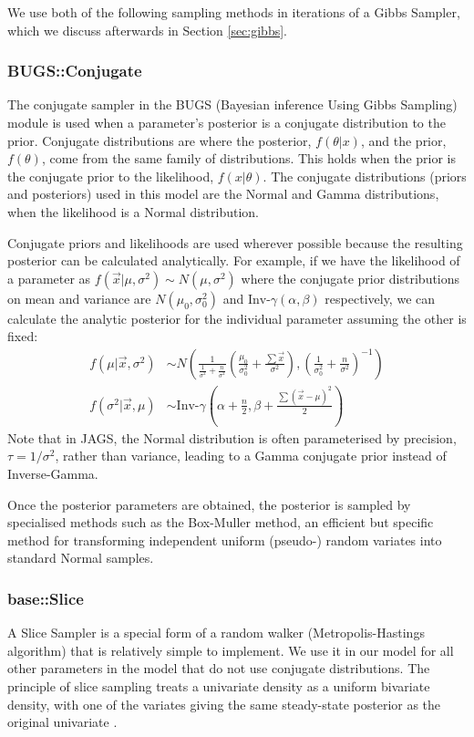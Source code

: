 \documentclass[a4paper, 12pt]{article}
\begin{document}
We use both of the following sampling methods in iterations of a Gibbs Sampler, which we discuss afterwards in Section \ref{sec:gibbs}.

\subsubsection{BUGS::Conjugate}
The conjugate sampler in the BUGS (Bayesian inference Using Gibbs Sampling) module is used when a parameter's posterior is a conjugate distribution to the prior. Conjugate distributions are where the posterior, $f(\theta|x)$, and the prior, $f(\theta)$, come from the same family of distributions. This holds when the prior is the conjugate prior to the likelihood, $f(x|\theta)$. The conjugate distributions (priors and posteriors) used in this model are the Normal and Gamma distributions, when the likelihood is a Normal distribution.

Conjugate priors and likelihoods are used wherever possible because the resulting posterior can be calculated analytically. For example, if we have the likelihood of a parameter as $f(\vec{x}|\mu,\sigma^2)\sim N(\mu,\sigma^2)$ where the conjugate prior distributions on mean and variance are $N(\mu_0,\sigma^2_0)$ and $\text{Inv-}\gamma(\alpha,\beta)$ respectively, we can calculate the analytic posterior for the individual parameter assuming the other is fixed:
\begin{align}
f(\mu|\vec{x},\sigma^2) &\sim N\left( \frac{1}{\frac{1}{\sigma^2} + \frac{n}{\sigma^2}} \left( \frac{\mu_0}{\sigma^2_0} + \frac{\sum\vec{x}}{\sigma^2} \right) , \left( \frac{1}{\sigma^2_0} + \frac{n}{\sigma^2} \right)^{-1} \right)\\
f(\sigma^2|\vec{x},\mu) &\sim \text{Inv-}\gamma \left( \alpha+\frac{n}{2} , \beta+\frac{\sum(\vec{x}-\mu)^2}{2} \right)
\end{align}
Note that in JAGS, the Normal distribution is often parameterised by precision, $\tau = 1/\sigma^2$, rather than variance, leading to a Gamma conjugate prior instead of Inverse-Gamma.

Once the posterior parameters are obtained, the posterior is sampled by specialised methods such as the Box-Muller method, an efficient but specific method for transforming independent uniform (pseudo-) random variates into standard Normal samples.

\subsubsection{base::Slice}
A Slice Sampler is a special form of a random walker (Metropolis-Hastings algorithm) that is relatively simple to implement. We use it in our model for all other parameters in the model that do not use conjugate distributions. The principle of slice sampling treats a univariate density as a uniform bivariate density, with one of the variates giving the same steady-state posterior as the original univariate \citep{Neal:2003}.
\end{document}
